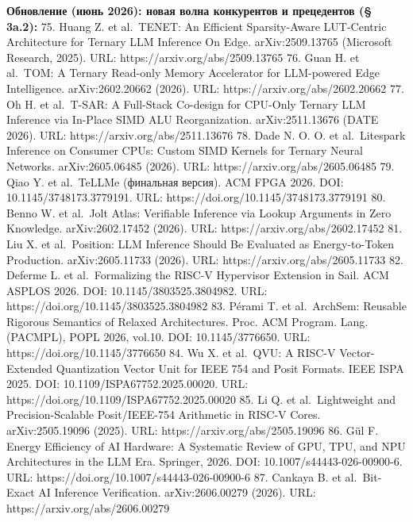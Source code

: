 \documentclass[
  russian,
]{article}
\begin{document}
\textbf{Обновление (июнь 2026): новая волна конкурентов и прецедентов (§
3a.2):} 75. Huang Z. et al.~TENET: An Efficient Sparsity-Aware
LUT-Centric Architecture for Ternary LLM Inference On Edge.
arXiv:2509.13765 (Microsoft Research, 2025). URL:
https://arxiv.org/abs/2509.13765 76. Guan H. et al.~TOM: A Ternary
Read-only Memory Accelerator for LLM-powered Edge Intelligence.
arXiv:2602.20662 (2026). URL: https://arxiv.org/abs/2602.20662 77. Oh H.
et al.~T-SAR: A Full-Stack Co-design for CPU-Only Ternary LLM Inference
via In-Place SIMD ALU Reorganization. arXiv:2511.13676 (DATE 2026). URL:
https://arxiv.org/abs/2511.13676 78. Dade N. O. O. et al.~Litespark
Inference on Consumer CPUs: Custom SIMD Kernels for Ternary Neural
Networks. arXiv:2605.06485 (2026). URL: https://arxiv.org/abs/2605.06485
79. Qiao Y. et al.~TeLLMe (финальная версия). ACM FPGA 2026. DOI:
10.1145/3748173.3779191. URL: https://doi.org/10.1145/3748173.3779191
80. Benno W. et al.~Jolt Atlas: Verifiable Inference via Lookup
Arguments in Zero Knowledge. arXiv:2602.17452 (2026). URL:
https://arxiv.org/abs/2602.17452 81. Liu X. et al.~Position: LLM
Inference Should Be Evaluated as Energy-to-Token Production.
arXiv:2605.11733 (2026). URL: https://arxiv.org/abs/2605.11733 82.
Deferme L. et al.~Formalizing the RISC-V Hypervisor Extension in Sail.
ACM ASPLOS 2026. DOI: 10.1145/3803525.3804982. URL:
https://doi.org/10.1145/3803525.3804982 83. Pérami T. et al.~ArchSem:
Reusable Rigorous Semantics of Relaxed Architectures. Proc. ACM Program.
Lang. (PACMPL), POPL 2026, vol.10. DOI: 10.1145/3776650. URL:
https://doi.org/10.1145/3776650 84. Wu X. et al.~QVU: A RISC-V
Vector-Extended Quantization Vector Unit for IEEE 754 and Posit Formats.
IEEE ISPA 2025. DOI: 10.1109/ISPA67752.2025.00020. URL:
https://doi.org/10.1109/ISPA67752.2025.00020 85. Li Q. et
al.~Lightweight and Precision-Scalable Posit/IEEE-754 Arithmetic in
RISC-V Cores. arXiv:2505.19096 (2025). URL:
https://arxiv.org/abs/2505.19096 86. Gül F. Energy Efficiency of AI
Hardware: A Systematic Review of GPU, TPU, and NPU Architectures in the
LLM Era. Springer, 2026. DOI: 10.1007/s44443-026-00900-6. URL:
https://doi.org/10.1007/s44443-026-00900-6 87. Cankaya B. et
al.~Bit-Exact AI Inference Verification. arXiv:2606.00279 (2026). URL:
https://arxiv.org/abs/2606.00279
\end{document}
